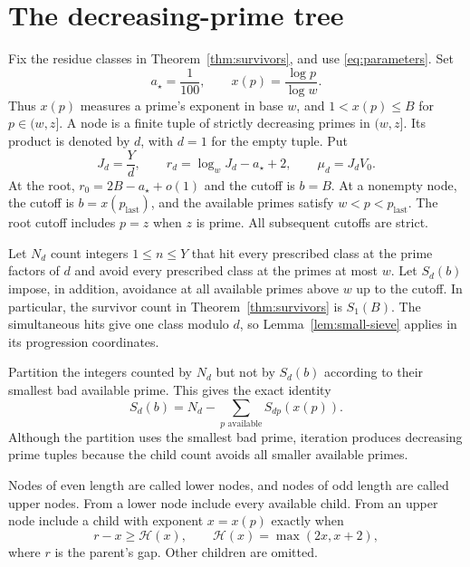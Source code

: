 \section{The decreasing-prime tree}\label{sec:tree}

Fix the residue classes in Theorem~\ref{thm:survivors}, and use
\eqref{eq:parameters}. Set
\[
 a_\star=\frac1{100},\qquad x(p)=\frac{\log p}{\log w}.
\]
Thus $x(p)$ measures a prime's exponent in base $w$, and
$1<x(p)\le B$ for $p\in(w,z]$.
A node is a finite tuple of strictly decreasing primes in $(w,z]$.
Its product is denoted by $d$, with $d=1$ for the empty tuple. Put
\begin{equation}\label{eq:tree-state}
 J_d=\frac Yd,\qquad
 r_d=\log_wJ_d-a_\star+2,\qquad \mu_d=J_dV_0.
\end{equation}
At the root, $r_0=2B-a_\star+o(1)$ and the cutoff is $b=B$.
At a nonempty node, the cutoff is $b=x(p_{\mathrm{last}})$, and the
available primes satisfy $w<p<p_{\mathrm{last}}$. The root cutoff
includes $p=z$ when $z$ is prime. All subsequent cutoffs are strict.

Let $N_d$ count integers $1\le n\le Y$ that hit every prescribed
class at the prime factors of $d$ and avoid every prescribed class at
the primes at most $w$. Let $S_d(b)$ impose, in addition, avoidance at
all available primes above $w$ up to the cutoff. In particular, the
survivor count in Theorem~\ref{thm:survivors} is $S_1(B)$.
The simultaneous hits give one class modulo $d$, so
Lemma~\ref{lem:small-sieve} applies in its progression coordinates.

Partition the integers counted by $N_d$ but not by $S_d(b)$ according
to their smallest bad available prime. This gives the exact identity
\begin{equation}\label{eq:tree-identity}
 S_d(b)=N_d-\sum_{p\text{ available}}S_{dp}(x(p)).
\end{equation}
Although the partition uses the smallest bad prime, iteration produces
decreasing prime tuples because the child count avoids all smaller
available primes.

Nodes of even length are called lower nodes, and nodes of odd length
are called upper nodes. From a lower node include every available
child. From an upper node include a child with exponent $x=x(p)$
exactly when
\begin{equation}\label{eq:admission}
 r-x\ge \mathcal H(x),\qquad \mathcal H(x)=\max(2x,x+2),
\end{equation}
where $r$ is the parent's gap. Other children are omitted.


